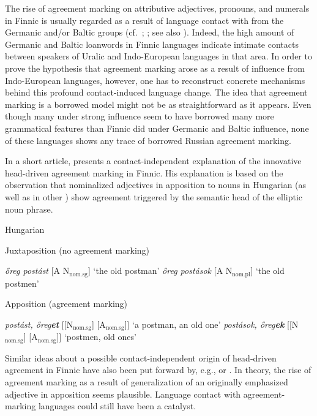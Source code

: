 {The rise of agreement marking on attributive adjectives, pronouns, and numerals in Finnic is usually regarded as a result of language contact with  from the Germanic and/or Baltic groups (cf.~\citealt[25]{tauli1955}; \citealt{hajdu1996}; see also \citealt[288–295]{stolz2015a}). Indeed, the high amount of Germanic and Baltic loanwords in Finnic languages indicate intimate contacts between speakers of Uralic and Indo-European languages in that area. In order to prove the hypothesis that agreement marking arose as a result of influence from Indo-European languages, however, one has to reconstruct concrete mechanisms behind this profound contact-induced language change. The idea that agreement marking is a borrowed model might not be as straightforward as it appears. Even though many  under strong  influence seem to have borrowed many more grammatical features than Finnic did under Germanic and Baltic influence, none of these languages shows any trace of borrowed Russian agreement marking.

In a short article, \citet{mark1979} presents a contact-independent explanation of the innovative head\hyp{}driven agreement marking in Finnic. His explanation is based on the observation that nominalized adjectives in apposition to nouns in Hungarian (as well as in other ) show agreement triggered by the semantic head of the elliptic noun phrase.
\begin{exe} \label{hung ap}
\ex \rm{Hungarian \citep[209]{mark1979}}
\begin{xlist}
\ex \rm{Juxtaposition (no agreement marking)}
\begin{xlist}
\ex \textit{őreg postást} 		\rm{[A N$_{\text{nom.sg}}$] ‘the old postman’}
\ex \textit{őreg postások} 		\rm{[A N$_{\text{nom.pl}}$] ‘the old postmen’}
\end{xlist}
\ex \rm{Apposition (agreement marking)}
\begin{xlist}
\ex \textit{postást, őreg\textbf{et}} 	\rm{[[N$_{\text{nom.sg}}$] [A$_{\text{nom.sg}}$]] ‘a postman, an old one’}
\ex \textit{postások, őreg\textbf{ek}} 	\rm{[[N$_{\text{nom.sg}}$] [A$_{\text{nom.sg}}$]] ‘postmen, old ones’}
\end{xlist}
\end{xlist}
\end{exe}
Similar ideas about a possible contact-independent origin of head\hyp{}driven agreement in Finnic have also been put forward by, e.g., \cite{ravila1941} or \cite{papp1962}. In theory, the rise of agreement marking as a result of generalization of an originally emphasized adjective in apposition seems plausible. Language contact with agreement-marking languages could still have been a catalyst. 

}
